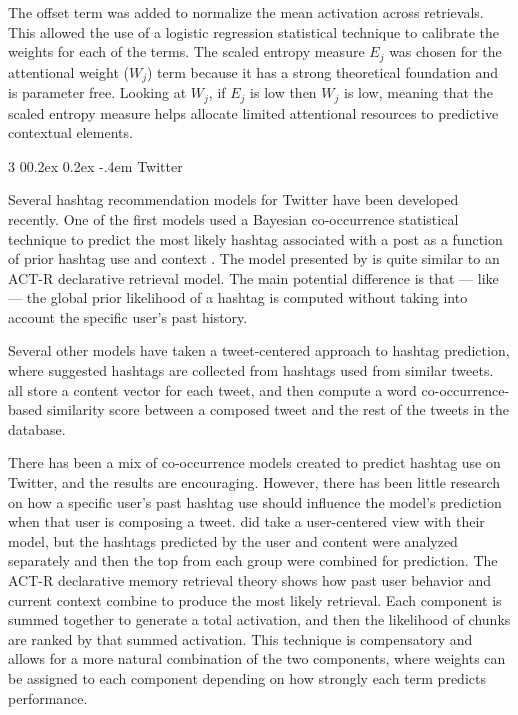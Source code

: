 \documentclass[man,donotrepeattitle]{apa6}
\makeatletter
\renewcommand{\subsubsection}{%
  \@startsection
  {subsubsection}%
  {3}%
  {\parindent}%
  {0\baselineskip \@plus 0.2ex \@minus 0.2ex}%
  {-.4em}%
  {\normalfont\normalsize\bfseries\addperi}}
\makeatother
\begin{document}
The offset term was added to normalize the mean activation across retrievals.
This allowed the use of a logistic regression statistical technique to calibrate the weights for each of the terms.
The scaled entropy measure $E_{j}$ was chosen for the attentional weight ($W_{j}$) term because it has a strong theoretical foundation \parencite{Dumais1991} and is parameter free.
Looking at $W_{j}$, if $E_{j}$ is low then $W_{j}$ is low, meaning that the scaled entropy measure helps allocate limited attentional resources to predictive contextual elements.

\subsubsection{Twitter}

Several hashtag recommendation models for Twitter have been developed recently.
One of the first models used a Bayesian co-occurrence statistical technique to predict the most likely hashtag associated with a post as a function of prior hashtag use and context \parencite{Mazzia2009}.
The model presented by \textcite{Mazzia2009} is quite similar to an ACT-R declarative retrieval model.
The main potential difference is that --- like \textcite{Stanley2013} --- the global prior likelihood of a hashtag is computed without taking into account the specific user's past history.

Several other models have taken a tweet-centered approach to hashtag prediction, where suggested hashtags are collected from hashtags used from similar tweets.
\textcites{Li2011, Zangerle2011, Kywe2012} all store a content vector for each tweet, and then compute a word co-occurrence-based similarity score between a composed tweet and the rest of the tweets in the database.

There has been a mix of co-occurrence models created to predict hashtag use on Twitter, and the results are encouraging.
However, there has been little research on how a specific user's past hashtag use should influence the model's prediction when that user is composing a tweet.
\textcite{Kywe2012} did take a user-centered view with their model, but the hashtags predicted by the user and content were analyzed separately and then the top from each group were combined for prediction.
The ACT-R declarative memory retrieval theory shows how past user behavior and current context combine to produce the most likely retrieval.
Each component is summed together to generate a total activation, and then the likelihood of chunks are ranked by that summed activation.
This technique is compensatory and allows for a more natural combination of the two components, where weights can be assigned to each component depending on how strongly each term predicts performance.
\end{document}
